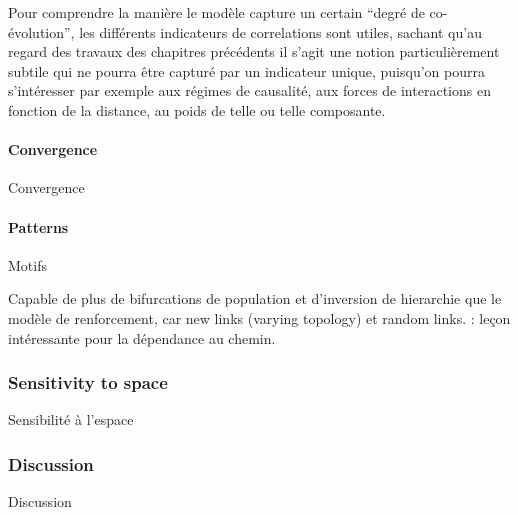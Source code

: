 Pour comprendre la manière le modèle capture un certain ``degré de co-évolution'', les différents indicateurs de correlations sont utiles, sachant qu'au regard des travaux des chapitres précédents il s'agit une notion particulièrement subtile qui ne pourra être capturé par un indicateur unique, puisqu'on pourra s'intéresser par exemple aux régimes de causalité, aux forces de interactions en fonction de la distance, au poids de telle ou telle composante.


\paragraph{Convergence}{Convergence}





\paragraph{Patterns}{Motifs}


Capable de plus de bifurcations de population et d'inversion de hierarchie que le modèle de renforcement, car new links (varying topology) et random links. : leçon intéressante pour la dépendance au chemin. 





\subsubsection{Sensitivity to space}{Sensibilité à l'espace}












\subsubsection{Discussion}{Discussion}





















